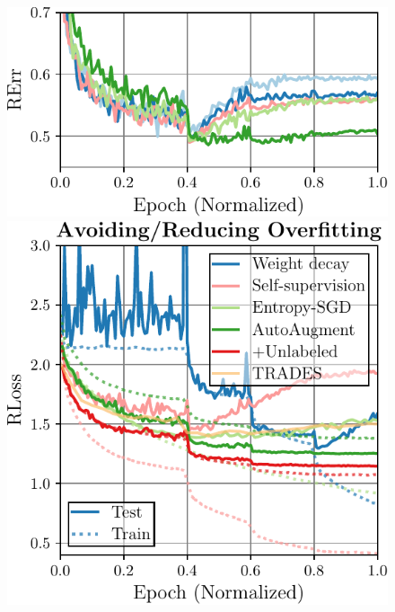 \begin{figure}[t]
\begin{minipage}[t]{0.175\textwidth}
		\includegraphics[width=\textwidth]{plots_main_understanding_ls_error}
	\end{minipage}
	\hspace*{1px} 
	\begin{minipage}[t]{0.2\textwidth}
		\vspace*{0px}
		 
		\includegraphics[width=\textwidth]{plots_main_understanding_delay+avoid}
	\end{minipage}
	\hspace*{1px}
	\begin{minipage}[t]{0.175\textwidth}
		\vspace*{0px}
		

\end{minipage}
\end{figure}
